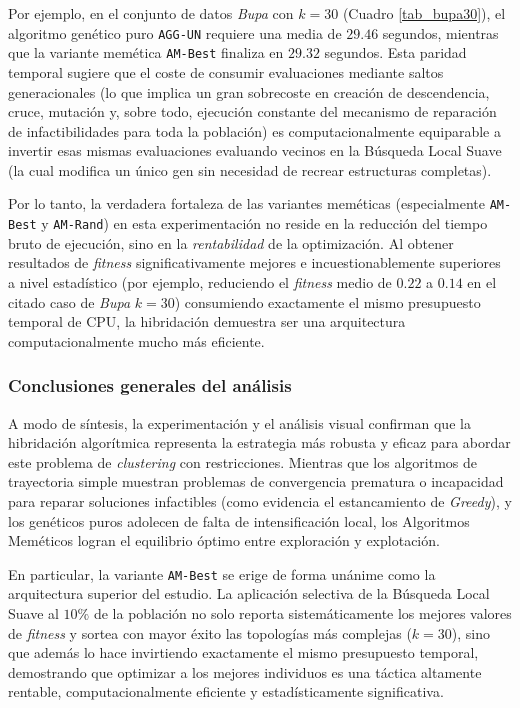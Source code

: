 \documentclass[a4paper,12pt]{article}%
\begin{document}
Por ejemplo, en el conjunto de datos \textit{Bupa} con $k=30$ (Cuadro \ref{tab_bupa30}), el algoritmo genético puro \texttt{AGG-UN} requiere una media de $29.46$ segundos, mientras que la variante memética \texttt{AM-Best} finaliza en $29.32$ segundos. Esta paridad temporal sugiere que el coste de consumir evaluaciones mediante saltos generacionales (lo que implica un gran sobrecoste en creación de descendencia, cruce, mutación y, sobre todo, ejecución constante del mecanismo de reparación de infactibilidades para toda la población) es computacionalmente equiparable a invertir esas mismas evaluaciones evaluando vecinos en la Búsqueda Local Suave (la cual modifica un único gen sin necesidad de recrear estructuras completas).

Por lo tanto, la verdadera fortaleza de las variantes meméticas (especialmente \texttt{AM-Best} y \texttt{AM-Rand}) en esta experimentación no reside en la reducción del tiempo bruto de ejecución, sino en la \textit{rentabilidad} de la optimización. Al obtener resultados de \textit{fitness} significativamente mejores e incuestionablemente superiores a nivel estadístico (por ejemplo, reduciendo el \textit{fitness} medio de $0.22$ a $0.14$ en el citado caso de \textit{Bupa} $k=30$) consumiendo exactamente el mismo presupuesto temporal de CPU, la hibridación demuestra ser una arquitectura computacionalmente mucho más eficiente.


\subsubsection{Conclusiones generales del análisis}

\noindent A modo de síntesis, la experimentación y el análisis visual confirman que la hibridación algorítmica representa la estrategia más robusta y eficaz para abordar este problema de \textit{clustering} con restricciones. Mientras que los algoritmos de trayectoria simple muestran problemas de convergencia prematura o incapacidad para reparar soluciones infactibles (como evidencia el estancamiento de \textit{Greedy}), y los genéticos puros adolecen de falta de intensificación local, los Algoritmos Meméticos logran el equilibrio óptimo entre exploración y explotación. 

En particular, la variante \texttt{AM-Best} se erige de forma unánime como la arquitectura superior del estudio. La aplicación selectiva de la Búsqueda Local Suave al $10\%$ de la población no solo reporta sistemáticamente los mejores valores de \textit{fitness} y sortea con mayor éxito las topologías más complejas ($k=30$), sino que además lo hace invirtiendo exactamente el mismo presupuesto temporal, demostrando que optimizar a los mejores individuos es una táctica altamente rentable, computacionalmente eficiente y estadísticamente significativa.
\end{document}
